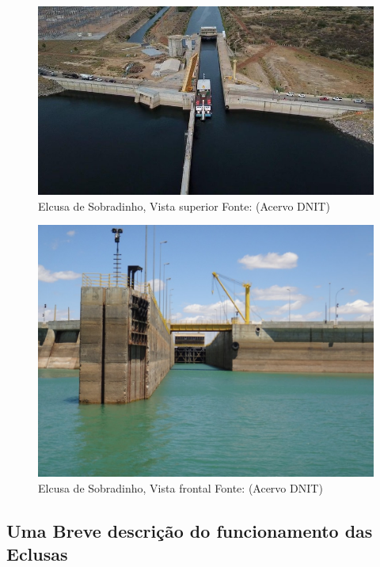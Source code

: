 \begin{figure}[h]
	\centering
	\label{fig:eclusasuperior}
		\includegraphics[keepaspectratio=true,scale=0.4]{figuras/Eclusa superior.jpeg}
	\caption{Elcusa de Sobradinho, Vista superior Fonte: (Acervo DNIT)}
\end{figure}
\begin{figure}[h]
	\centering
	\label{fig:eclusafrente}
		\includegraphics[keepaspectratio=true,scale=0.35]{figuras/eclusa frontal.jpg}
	\caption{Elcusa de Sobradinho, Vista frontal Fonte: (Acervo DNIT)}
\end{figure}



\subsection{Uma Breve descrição do funcionamento das Eclusas}


